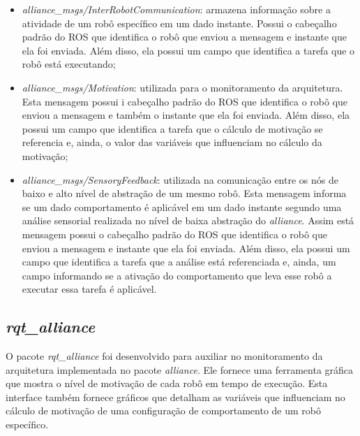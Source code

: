             \begin{itemize}
                \item \textit{alliance\_msgs/InterRobotCommunication}: armazena informação sobre a atividade de um robô específico em um dado instante. Possui o cabeçalho padrão do ROS que identifica o robô que enviou a mensagem e instante que ela foi enviada. Além disso, ela possui um campo que identifica a tarefa que o robô está executando;
                \item \textit{alliance\_msgs/Motivation}: utilizada para o monitoramento da arquitetura. Esta mensagem possui i cabeçalho padrão do ROS que identifica o robô que enviou a mensagem e também o instante que ela foi enviada. Além disso, ela possui um campo que identifica a tarefa que o cálculo de motivação se referencia e, ainda, o valor das variáveis que influenciam no cálculo da motivação;
                \item \textit{alliance\_msgs/SensoryFeedback}: utilizada na comunicação entre os nós de baixo e alto nível de abstração de um mesmo robô. Esta mensagem informa se um dado comportamento é aplicável em um dado instante segundo uma análise sensorial realizada no nível de baixa abstração do \textit{alliance}. Assim está mensagem possui o cabeçalho padrão do ROS que identifica o robô que enviou a mensagem e instante que ela foi enviada. Além disso, ela possui um campo que identifica a tarefa que a análise está referenciada e, ainda, um campo informando se a ativação do comportamento que leva esse robô a executar essa tarefa é aplicável.
            \end{itemize}
        
        \subsection{\textit{rqt\_alliance}}
            O pacote \textit{rqt\_alliance} foi desenvolvido para auxiliar no monitoramento da arquitetura implementada no pacote \textit{alliance}. Ele fornece uma ferramenta gráfica que mostra o nível de motivação de cada robô em tempo de execução. Esta interface também fornece gráficos que detalham as variáveis que influenciam no cálculo de motivação de uma configuração de comportamento de um robô específico.
            
